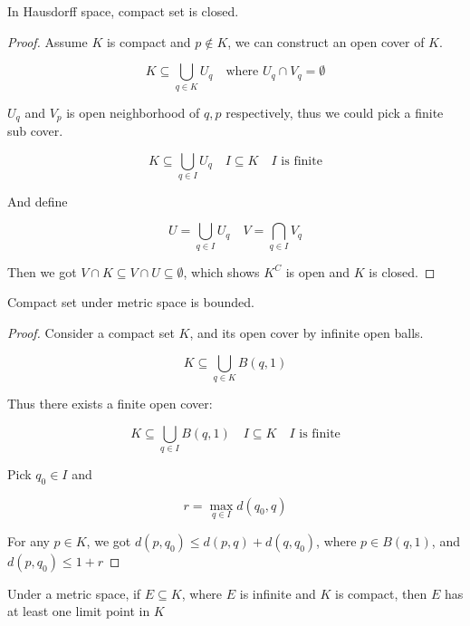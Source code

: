 \begin{thm}
    In Hausdorff space, compact set is closed.
\end{thm}

\begin{proof}
   Assume $K$ is compact and $p \notin K$, we can construct an open cover of $K$.

   \[
        K \subseteq \bigcup_{q \in K} U_q \quad \text{where } U_q \cap V_q = \emptyset
   \]

   $U_q$ and $V_p$ is open neighborhood of $q,p$ respectively, thus we could pick a finite sub cover.

   \[
        K \subseteq \bigcup_{q \in I} U_q \quad I \subseteq K \quad I \text{ is finite}
   \]

   And define

   \[
    U = \bigcup_{q \in I} U_q \quad V = \bigcap_{q \in I} V_q
   \]

   Then we got $V \cap K \subseteq V \cap U \subseteq \emptyset$, which shows $K^C$ is open and $K$ is closed.
\end{proof}

\begin{thm}
    Compact set under metric space is bounded.
\end{thm}

\begin{proof}
    Consider a compact set $K$, and its open cover by infinite open balls.

    \[
       K \subseteq \bigcup_{q \in K} B(q, 1) 
    \]

    Thus there exists a finite open cover:

    \[
       K \subseteq \bigcup_{q \in I} B(q, 1) \quad I \subseteq K \quad I \text{ is finite}
    \]

    Pick $q_0 \in I$ and 

    \[
        r = \max_{q \in I} d(q_0, q)
    \]

    For any $p \in K$, we got $d(p, q_0) \le d(p, q) + d(q, q_0)$, where $p \in B(q, 1)$, and $d(p, q_0) \le 1 + r$
\end{proof}

\begin{thm}\label{e603cd67}
    Under a metric space, if $E \subseteq K$, where $E$ is infinite and $K$ is compact, then $E$ has at least
    one limit point in $K$
\end{thm}

